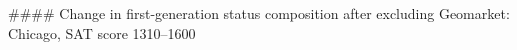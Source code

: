 #### Change in first-generation status composition after excluding Geomarket: Chicago, SAT score 1310–1600
